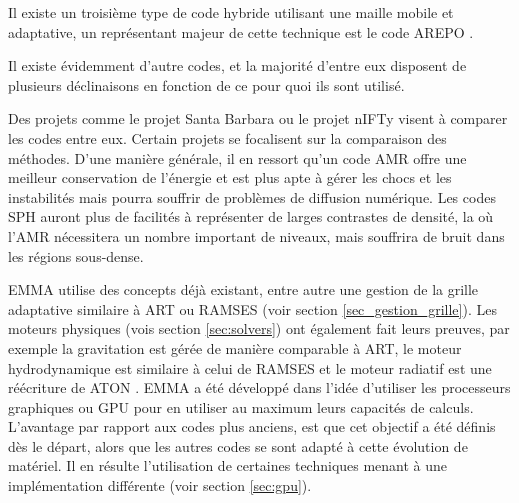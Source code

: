Il existe un troisième type de code hybride utilisant une maille mobile et adaptative, un représentant majeur de cette technique est le code AREPO \citep{2010MNRAS.401..791S}.

Il existe évidemment d'autre codes, et la majorité d'entre eux disposent de plusieurs déclinaisons en fonction de ce pour quoi ils sont utilisé.

Des projets comme le projet Santa Barbara \citep{1999ApJ...525..554F} ou le projet nIFTy \citep{sembolini_nifty_2015} visent à comparer les codes entre eux.
Certain projets \citep{2007MNRAS.380..963A, oshea_comparing_2005} se focalisent sur la comparaison des méthodes.
D'une manière générale, il en ressort qu'un code \ac{AMR} offre une meilleur conservation de l’énergie et est plus apte à gérer les chocs et les instabilités mais pourra souffrir de problèmes de diffusion numérique.
Les codes \ac{SPH} auront plus de facilités à représenter de larges contrastes de densité, la où l'\ac{AMR} nécessitera un nombre important de niveaux, mais souffrira de bruit dans les régions sous-dense.

EMMA utilise des concepts déjà existant, entre autre une gestion de la grille adaptative similaire à ART ou RAMSES (voir section \ref{sec_gestion_grille}).
Les moteurs physiques (vois section \ref{sec:solvers}) ont également fait leurs preuves, par exemple la gravitation est gérée de manière comparable à ART, le moteur hydrodynamique est similaire à celui de RAMSES et le moteur radiatif est une réécriture de ATON \citep{aubert_radiative_2008}.
EMMA a été développé dans l'idée d'utiliser les processeurs graphiques ou \ac{GPU} pour en utiliser au maximum leurs capacités de calculs.
L'avantage par rapport aux codes plus anciens, est que cet objectif a été définis dès le départ, alors que les autres codes se sont adapté à cette évolution de matériel.
Il en résulte l'utilisation de certaines techniques menant à une implémentation différente (voir section \ref{sec:gpu}).


%

